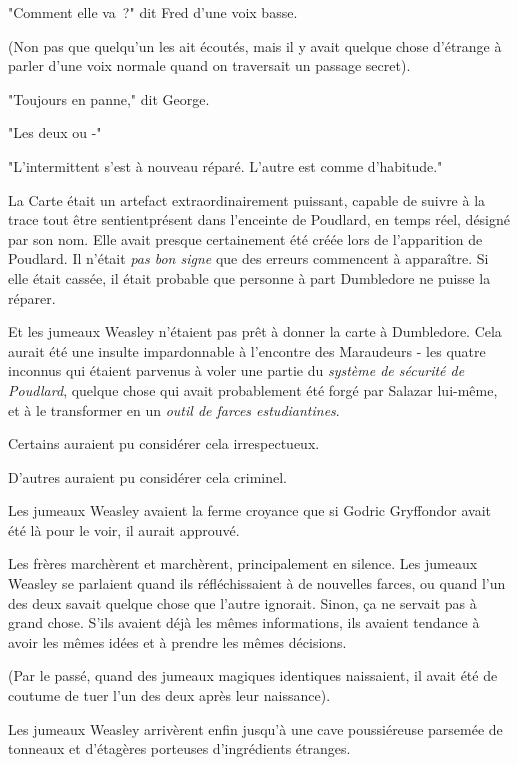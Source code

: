 "Comment elle va~?" dit Fred d'une voix basse.

(Non pas que quelqu'un les ait écoutés, mais il y avait quelque chose d'étrange à parler d'une voix normale quand on traversait un passage secret).

"Toujours en panne," dit George.

"Les deux ou -"

"L'intermittent s'est à nouveau réparé. L'autre est comme d'habitude."

La Carte était un artefact extraordinairement puissant, capable de suivre à la trace tout être sentient\protect\footnotemark présent dans l'enceinte de Poudlard, en temps réel, désigné par son nom. Elle avait presque certainement été créée lors de l'apparition de Poudlard. Il n'était \emph{pas bon signe} que des erreurs commencent à apparaître. Si elle était cassée, il était probable que personne à part Dumbledore ne puisse la réparer.

Et les jumeaux Weasley n'étaient pas prêt à donner la carte à Dumbledore. Cela aurait été une insulte impardonnable à l'encontre des Maraudeurs - les quatre inconnus qui étaient parvenus à voler une partie du \emph{système de sécurité de Poudlard}, quelque chose qui avait probablement été forgé par Salazar lui-même, et à le transformer en un \emph{outil de farces estudiantines}.

Certains auraient pu considérer cela irrespectueux.

D'autres auraient pu considérer cela criminel.

Les jumeaux Weasley avaient la ferme croyance que si Godric Gryffondor avait été là pour le voir, il aurait approuvé.

Les frères marchèrent et marchèrent, principalement en silence. Les jumeaux Weasley se parlaient quand ils réfléchissaient à de nouvelles farces, ou quand l'un des deux savait quelque chose que l'autre ignorait. Sinon, ça ne servait pas à grand chose. S'ils avaient déjà les mêmes informations, ils avaient tendance à avoir les mêmes idées et à prendre les mêmes décisions.

(Par le passé, quand des jumeaux magiques identiques naissaient, il avait été de coutume de tuer l'un des deux après leur naissance).

Les jumeaux Weasley arrivèrent enfin jusqu'à une cave poussiéreuse parsemée de tonneaux et d'étagères porteuses d'ingrédients étranges.

